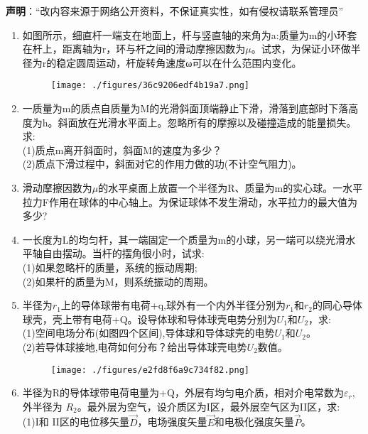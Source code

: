 
\textbf{声明}：“改内容来源于网络公开资料，不保证真实性，如有侵权请联系管理员”

\begin{enumerate}
\item 如图所示，细直杆一端支在地面上，杆与竖直轴的来角为a:质量为m的小环套在杆上，距离轴为r，环与杆之间的滑动摩擦因数为$\mu$。试求，为保证小环做半径为r的稳定圆周运动，杆旋转角速度ω可以在什么范围内变化。
\begin{figure}[ht]
\centering
\texttt{[image: ./figures/36c9206edf4b19a7.png]}
\caption{} \label{fig_SSD11_1}
\end{figure}
\item 一质量为m的质点自质量为M的光滑斜面顶端静止下滑，滑落到底部时下落高度为h。斜面放在光滑水平面上。忽略所有的摩擦以及碰撞造成的能量损失。求:\\
(1)质点m离开斜面时，斜面M的速度为多少？\\
(2)质点下滑过程中，斜面对它的作用力做的功(不计空气阻力)。
\item 滑动摩擦因数为$\mu$的水平桌面上放置一个半径为R、质量为m的实心球。一水平拉力F作用在球体的中心轴上。为保证球体不发生滑动，水平拉力的最大值为多少?
\item 一长度为L的均匀杆，其一端固定一个质量为m的小球，另一端可以绕光滑水平轴自由摆动。当杆的摆角很小时，试求:\\
(1)如果忽略杆的质量，系统的振动周期;\\
(2)如果杆的质量为M，则系统振动的周期。
\item 半径为$r_1$上的导体球带有电荷+q,球外有一个内外半径分别为$r_1$和$r_2$的同心导体球壳，壳上带有电荷+Q。设导体球和导体球壳电势分别为$U_1$和$U_2$，求:\\
(1)空间电场分布(如图四个区间),导体球和导体球壳的电势$U_1$和$U_2$。\\
(2)若导体球接地,电荷如何分布？给出导体球壳电势$U_2$数值。
\begin{figure}[ht]
\centering
\texttt{[image: ./figures/e2fd8f6a9c734f82.png]}
\caption{} \label{fig_SSD11_2}
\end{figure}
\item 半径为R的导体球带电荷电量为+Q，外层有均匀电介质，相对介电常数为$\varepsilon_r$,外半径为 $R_2$。最外层为空气，设介质区为I区，最外层空气区为II区，求:\\
(1)I和 II区的电位移矢量$\vec D$，电场强度矢量$\vec E$和电极化强度矢量$\vec P$。\\

\end{enumerate}
